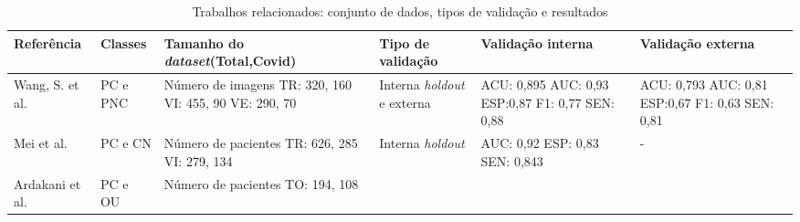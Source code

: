\begin{table}[ht]
\centering
\caption{Trabalhos relacionados: conjunto de dados, tipos de validação e resultados} 
\label{table:trabalhos_relacionados_dados_validacao}
\begin{tabularx}{1.0\textwidth} { 
  >{\raggedright\arraybackslash}X 
  >{\raggedright\arraybackslash}X
  >{\hsize=2.8cm\raggedright\arraybackslash}X
  >{\raggedright\arraybackslash}X
  >{\raggedright\arraybackslash}X 
  >{\centering\arraybackslash}X }
 \toprule   
 Referência & 
 Classes & 
 Tamanho do \textit{dataset}\newline(Total,Covid) & 
 Tipo de  \newline validação &  
 Validação interna &
 Validação externa \\ 
\midrule

Wang, S. et al. \cite{wang2021deep} & 

PC e PNC & 

Número de imagens\newline
TR: 320, 160 \newline
VI: 455, 90 \newline 
VE: 290, 70 
& 

Interna \textit{holdout} e externa & 

ACU: 0,895
AUC: 0,93
ESP:0,87
F1: 0,77
SEN: 0,88 &

ACU: 0,793
AUC: 0,81
ESP:0,67
F1: 0,63
SEN: 0,81

\\

Mei et al. \cite{mei2020artificial} & 
 
PC e CN & 
 
Número de pacientes\newline
TR: 626, 285\newline
VI: 279, 134
\newline&
 
Interna \textit{holdout} & 
 
AUC: 0,92
ESP: 0,83
SEN: 0,843 \newline&

-

\\

Ardakani et al. \cite{ardakani2020application} & 
 
PC e OU & 
 
Número de pacientes\newline
TO: 194, 108 & 
 

\end{tabularx}
\end{table}
